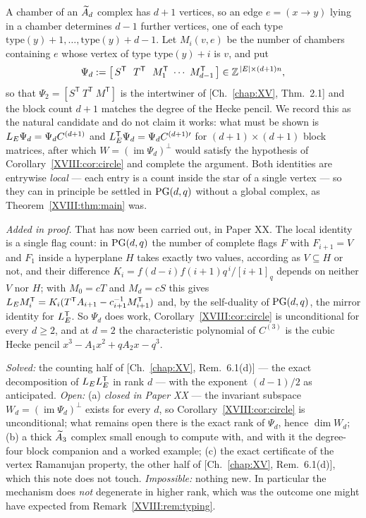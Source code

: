 \begin{remark}\label{XVIII:rem:psi}
A chamber of an $\widetilde A_{d}$ complex has $d+1$ vertices, so an edge $e=(x\to y)$ lying in a
chamber determines $d-1$ further vertices, one of each type
$\mathrm{type}(y)+1,\dots,\mathrm{type}(y)+d-1$. Let $M_i(v,e)$ be the number of chambers
containing $e$ whose vertex of type $\mathrm{type}(y)+i$ is $v$, and put
\[
\Psi_d:=\bigl[\,S^{\mathsf T}\ \ T^{\mathsf T}\ \ M_1^{\mathsf T}\ \cdots\
M_{d-1}^{\mathsf T}\,\bigr]\in\Z^{\,|E|\times(d+1)n},
\]
so that $\Psi_2=[S^{\mathsf T}\ T^{\mathsf T}\ M^{\mathsf T}]$ is the intertwiner of
[Ch.~\ref{chap:XV}, Thm.~2.1] and the block count $d+1$ matches the degree of the Hecke pencil. We record
this as the natural candidate and do not claim it works: what must be shown is
$L_E\Psi_d=\Psi_dC^{(d+1)}$ and $L_E^{\mathsf T}\Psi_d=\Psi_dC^{(d+1)\prime}$ for
$(d+1)\times(d+1)$ block matrices, after which $W=(\operatorname{im}\Psi_d)^{\perp}$ would
satisfy the hypothesis of Corollary~\ref{XVIII:cor:circle} and complete the argument. Both
identities are entrywise \emph{local} --- each entry is a count inside the star of a single
vertex --- so they can in principle be settled in $\mathrm{PG}(d,q)$ without a global complex, as
Theorem~\ref{XVIII:thm:main} was.

\emph{Added in proof.} That has now been carried out, in Paper XX. The local identity is a
single flag count: in $\mathrm{PG}(d,q)$ the number of complete flags $F$ with $F_{i+1}=V$ and $F_1$
inside a hyperplane $H$ takes exactly two values, according as $V\subseteq H$ or not, and
their difference $K_i=f(d-i)f(i+1)q^{\,i}/[i+1]_q$ depends on neither $V$ nor $H$; with
$M_0=cT$ and $M_d=cS$ this gives
$L_E M_i^{\mathsf T}=K_i(T^{\mathsf T}A_{i+1}-c_{i+1}^{-1}M_{i+1}^{\mathsf T})$ and, by the
self-duality of $\mathrm{PG}(d,q)$, the mirror identity for $L_E^{\mathsf T}$. So $\Psi_d$ does work,
Corollary~\ref{XVIII:cor:circle} is unconditional for every $d\ge2$, and at $d=2$ the
characteristic polynomial of $C^{(3)}$ is the cubic Hecke pencil $x^3-A_1x^2+qA_2x-q^3$.
\end{remark}

\begin{remark}\label{XVIII:rem:soi}
\emph{Solved:} the counting half of [Ch.~\ref{chap:XV}, Rem.~6.1(d)] --- the exact decomposition of
$L_EL_E^{\mathsf T}$ in rank $d$ --- with the exponent $(d-1)/2$ as anticipated.
\emph{Open:} (a) \emph{closed in Paper XX} --- the invariant subspace
$W_d=(\operatorname{im}\Psi_d)^{\perp}$ exists for every $d$, so
Corollary~\ref{XVIII:cor:circle} is unconditional; what remains open there is the exact rank of
$\Psi_d$, hence $\dim W_d$;
(b) a thick $\widetilde A_{3}$ complex small enough to compute with, and with it the degree-four
block companion and a worked example; (c) the exact certificate of the vertex Ramanujan
property, the other half of [Ch.~\ref{chap:XV}, Rem.~6.1(d)], which this note does not touch.
\emph{Impossible:} nothing new. In particular the mechanism does \emph{not} degenerate in
higher rank, which was the outcome one might have expected from
Remark~\ref{XVIII:rem:typing}.
\end{remark}

